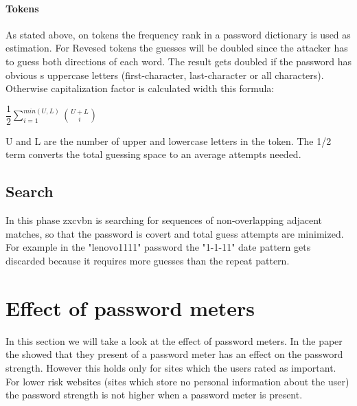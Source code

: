 \documentclass[12pt,a4paper]{article}
\begin{document}
\paragraph{Tokens}
As stated above, on tokens the frequency rank in a password dictionary is used as estimation. For Revesed tokens the guesses will be doubled since the attacker has to guess both directions of each word. The result gets doubled if the password has obvious s uppercase letters (first-character, last-character or all characters). Otherwise capitalization factor is calculated width this formula:

\begin{center} $ \dfrac{1}{2} \sum\limits_{i=1}^{min(U,L)} \binom{U+L}{i} $ \end{center}

U and L are the number of upper and lowercase letters in the token. The 1/2 term converts the total guessing space to an average attempts needed.


\subsection{Search}

In this phase zxcvbn is searching for sequences of non-overlapping adjacent matches, so that the password is covert and total guess attempts are minimized. For example in the "lenovo1111" password the "1-1-11" date pattern gets discarded because it requires more guesses than the repeat pattern.


\section{Effect of password meters}
\label{sec:effect}
In this section we will take a look at the effect of password meters.
In the paper  \cite{upToEleven} the showed that they present of a password meter has an effect on the password strength. However this holds only for sites which the users rated as important. For lower risk websites (sites which store no personal information about the user) the password strength is not higher when a password meter is present.




\printbibliography
\end{document}
